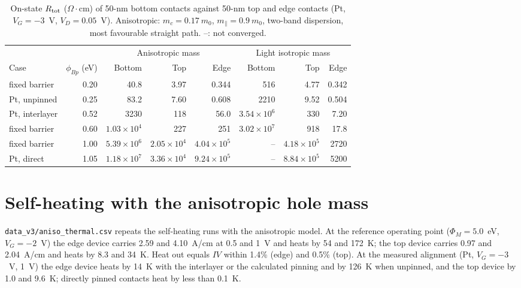 \documentclass[11pt]{article}
\providecommand{\ohmcm}{\ensuremath{\Omega\cdot\mathrm{cm}}}
\providecommand{\ohmcm}{\ensuremath{\Omega\cdot\mathrm{cm}}}
\begin{document}
\begin{table}[!htbp]
\centering
\caption{On-state $R_{\rm tot}$ (\ohmcm) of 50-nm bottom contacts against 50-nm top and edge contacts (Pt, $V_G=-3$~V, $V_D=0.05$~V). Anisotropic: $m_c=0.17~m_0$, $m_\parallel=0.9~m_0$, two-band dispersion, most favourable straight path. --: not converged.}
\label{tab:bottom}\footnotesize\setlength{\tabcolsep}{4pt}
\begin{tabular}{lrrrrrrr}
\toprule
 & & \multicolumn{3}{c}{Anisotropic mass} & \multicolumn{3}{c}{Light isotropic mass} \\
Case & $\phi_{Bp}$ (eV) & Bottom & Top & Edge & Bottom & Top & Edge \\
\midrule
fixed barrier & 0.20 & 40.8 & 3.97 & 0.344 & 516 & 4.77 & 0.342 \\
Pt, unpinned & 0.25 & 83.2 & 7.60 & 0.608 & 2210 & 9.52 & 0.504 \\
Pt, interlayer & 0.52 & 3230 & 118 & 56.0 & $3.54\times10^6$ & 330 & 7.20 \\
fixed barrier & 0.60 & $1.03\times10^4$ & 227 & 251 & $3.02\times10^7$ & 918 & 17.8 \\
fixed barrier & 1.00 & $5.39\times10^6$ & $2.05\times10^4$ & $4.04\times10^5$ & -- & $4.18\times10^5$ & 2720 \\
Pt, direct & 1.05 & $1.18\times10^7$ & $3.36\times10^4$ & $9.24\times10^5$ & -- & $8.84\times10^5$ & 5200 \\
\bottomrule
\end{tabular}
\end{table}

\section{Self-heating with the anisotropic hole mass}
\label{sec:anisoheat}
\texttt{data\_v3/aniso\_thermal.csv} repeats the self-heating runs with the anisotropic model. At the reference operating point ($\Phi_M=5.0$~eV, $V_G=-2$~V) the edge device carries 2.59 and 4.10~A/cm at 0.5 and 1~V and heats by 54 and 172~K; the top device carries 0.97 and 2.04~A/cm and heats by 8.3 and 34~K. Heat out equals $IV$ within 1.4\% (edge) and 0.5\% (top). At the measured alignment (Pt, $V_G=-3$~V, 1~V) the edge device heats by 14~K with the interlayer or the calculated pinning and by 126~K when unpinned, and the top device by 1.0 and 9.6~K; directly pinned contacts heat by less than 0.1~K.
\end{document}
